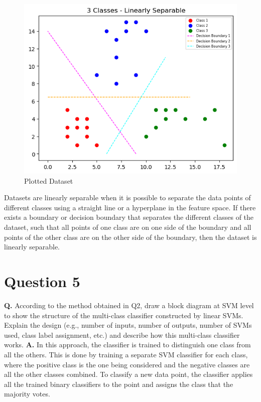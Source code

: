 \documentclass[12pt]{report}
\begin{document}
\begin{figure}[H]
	\centering
	\includegraphics[width=\textwidth]{plot.png}
	\caption{Plotted Dataset}
\end{figure}

Datasets are linearly separable when it is possible to separate the data points of different classes using a straight line or a hyperplane in the feature space. If there exists a boundary or decision boundary that separates the different classes of the dataset, such that all points of one class are on one side of the boundary and all points of the other class are on the other side of the boundary, then the dataset is linearly separable.

\section{Question 5}

\textbf{Q.} According to the method obtained in Q2, draw a block diagram at SVM level to
show the structure of the multi-class classifier constructed by linear SVMs. Explain
the design (e.g., number of inputs, number of outputs, number of SVMs used, class
label assignment, etc.) and describe how this multi-class classifier works.\newline\newline
\textbf{A.} In this approach, the classifier is trained to distinguish one class from all the others. This is done by training a separate SVM classifier for each class, where the positive class is the one being considered and the negative classes are all the other classes combined.
To classify a new data point, the classifier applies all the trained binary classifiers to the point and assigns the class that the majority votes.\newline\newline
\end{document}
